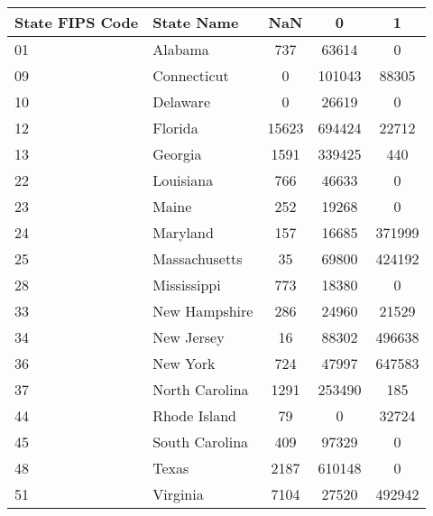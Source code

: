 \begin{tabular}{llccc}
  \hline
State FIPS Code & State Name & NaN & 0 & 1 \\ 
  \hline
01 & Alabama & 737 & 63614 &   0 \\ 
  09 & Connecticut &   0 & 101043 & 88305 \\ 
  10 & Delaware &   0 & 26619 &   0 \\ 
  12 & Florida & 15623 & 694424 & 22712 \\ 
  13 & Georgia & 1591 & 339425 & 440 \\ 
  22 & Louisiana & 766 & 46633 &   0 \\ 
  23 & Maine & 252 & 19268 &   0 \\ 
  24 & Maryland & 157 & 16685 & 371999 \\ 
  25 & Massachusetts &  35 & 69800 & 424192 \\ 
  28 & Mississippi & 773 & 18380 &   0 \\ 
  33 & New Hampshire & 286 & 24960 & 21529 \\ 
  34 & New Jersey &  16 & 88302 & 496638 \\ 
  36 & New York & 724 & 47997 & 647583 \\ 
  37 & North Carolina & 1291 & 253490 & 185 \\ 
  44 & Rhode Island &  79 &   0 & 32724 \\ 
  45 & South Carolina & 409 & 97329 &   0 \\ 
  48 & Texas & 2187 & 610148 &   0 \\ 
  51 & Virginia & 7104 & 27520 & 492942 \\ 
   \hline
\end{tabular}

